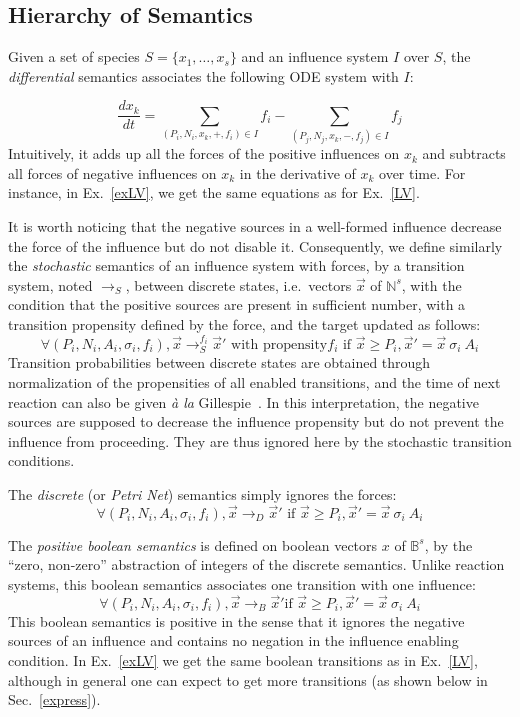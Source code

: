 \documentclass{llncs}
\newcommand{\lra}{\longrightarrow}
\begin{document}
\subsection{Hierarchy of Semantics}

Given a set of species $S=
\{x_1,\dots,x_s\}$ and an influence system $I$ over $S$, 
the \emph{differential} semantics associates the following ODE system with $I$:

\[
   \frac{dx_k}{dt} = \sum_{(P_i, N_i, x_k, +, f_i) \in I}f_i - \sum_{(P_j, N_j, x_k, -, f_j) \in I}f_j
\]
Intuitively, it adds up all the forces of the positive influences on $x_k$ and
subtracts all forces of negative influences on $x_k$ in the derivative of
$x_k$ over time.
For instance, in Ex.~\ref{exLV}, we get the same equations as for Ex.~\ref{LV}. 

It is worth noticing that the negative sources in a well-formed influence
decrease the force of the influence but do not disable it.
Consequently, we define similarly the \emph{stochastic} semantics of an influence system with forces,
by a transition system, noted $\lra_S$, between discrete states, i.e.~vectors $\vec x$ of $\mathbb{N}^s$,
with the condition that the positive sources are present in sufficient number,
with a transition propensity defined by the force,
and the target updated as follows:
      $$\forall (P_i, N_i, A_i, \sigma_i, f_i), {\vec x}\lra_S^{f_i}{\vec x'} \text{ with propensity}f_i\text{ if } {\vec x}\geq P_i, {\vec x'} = {\vec x}\  \sigma_i\ A_i$$
Transition probabilities between discrete states are obtained through
normalization of the propensities of all enabled transitions,
and the time of next reaction can also be given \emph{\`a la} Gillespie~\cite{Gillespie77jpc}.
      In this interpretation, the negative sources are supposed to decrease the influence propensity but do not prevent the influence from proceeding.
      They are thus ignored here by the stochastic transition conditions.

      The \emph{discrete} (or \emph{Petri Net}) semantics simply ignores the forces:
      $$\forall (P_i, N_i, A_i, \sigma_i, f_i), {\vec x}\lra_D{\vec x'}\text{ if }      {\vec x}\geq P_i, {\vec x'} = {\vec x}\ \sigma_i\ A_i$$

The \emph{positive boolean semantics} is defined on boolean vectors $x$ of $\mathbb{B}^s$,
by the ``zero, non-zero'' abstraction of integers of the discrete semantics. Unlike reaction systems, this boolean semantics associates one transition with one influence:
$$\forall (P_i, N_i, A_i, \sigma_i, f_i), {\vec       x}\lra_B{\vec x'}\text{
if }{\vec x}\geq P_i, {\vec x'} =       {\vec x}\ \sigma_i\ A_i$$
This boolean semantics is positive in the sense that it ignores the negative sources of an influence
and contains no negation in the influence enabling condition.
In Ex.~\ref{exLV} we get the same boolean transitions as in Ex.~\ref{LV}, although in general one can expect to get more transitions (as shown below in Sec.~\ref{express}).
\end{document}
